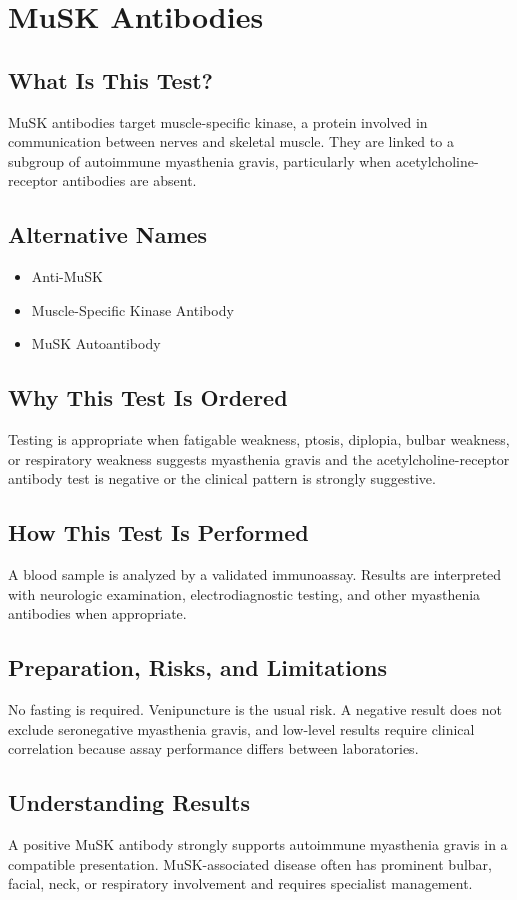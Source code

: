 \chapter{MuSK Antibodies}

\section*{What Is This Test?}
MuSK antibodies target muscle-specific kinase, a protein involved in communication between nerves and skeletal muscle. They are linked to a subgroup of autoimmune myasthenia gravis, particularly when acetylcholine-receptor antibodies are absent.

\section*{Alternative Names}
\begin{itemize}
  \item Anti-MuSK
  \item Muscle-Specific Kinase Antibody
  \item MuSK Autoantibody
\end{itemize}
\section*{Why This Test Is Ordered}
Testing is appropriate when fatigable weakness, ptosis, diplopia, bulbar weakness, or respiratory weakness suggests myasthenia gravis and the acetylcholine-receptor antibody test is negative or the clinical pattern is strongly suggestive.

\section*{How This Test Is Performed}
A blood sample is analyzed by a validated immunoassay. Results are interpreted with neurologic examination, electrodiagnostic testing, and other myasthenia antibodies when appropriate.

\section*{Preparation, Risks, and Limitations}
No fasting is required. Venipuncture is the usual risk. A negative result does not exclude seronegative myasthenia gravis, and low-level results require clinical correlation because assay performance differs between laboratories.

\section*{Understanding Results}
A positive MuSK antibody strongly supports autoimmune myasthenia gravis in a compatible presentation. MuSK-associated disease often has prominent bulbar, facial, neck, or respiratory involvement and requires specialist management.

